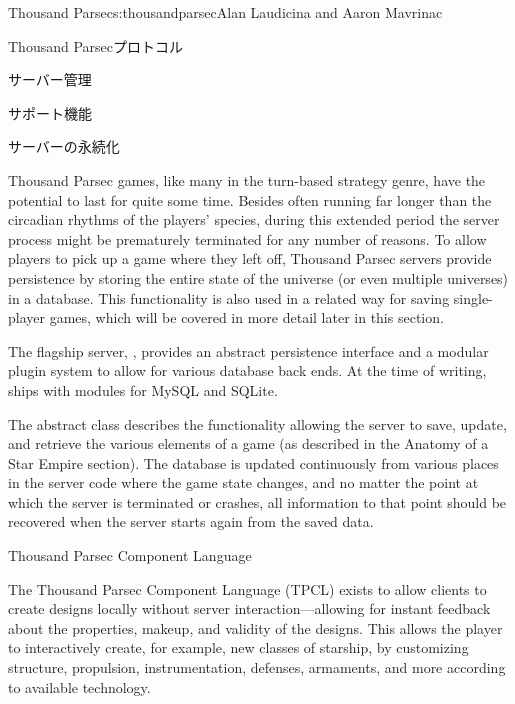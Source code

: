 \begin{aosachapter}{Thousand Parsec}{s:thousandparsec}{Alan Laudicina and Aaron Mavrinac}
\begin{aosasect1}{Thousand Parsecプロトコル}
\begin{aosasect2}{サーバー管理}
\end{aosasect2}

\end{aosasect1}

\begin{aosasect1}{サポート機能}

\begin{aosasect2}{サーバーの永続化}

Thousand Parsec games, like many in the turn-based strategy genre,
have the potential to last for quite some time. Besides often running
far longer than the circadian rhythms of the players' species, during
this extended period the server process might be prematurely
terminated for any number of reasons. To allow players to pick up a
game where they left off, Thousand Parsec servers provide persistence
by storing the entire state of the universe (or even multiple
universes) in a database. This functionality is also used in a related
way for saving single-player games, which will be covered in more
detail later in this section.

The flagship server, , provides an abstract
persistence interface and a modular plugin system to allow for various
database back ends. At the time of writing,  ships
with modules for MySQL and SQLite.

The abstract  class describes the functionality
allowing the server to save, update, and retrieve the various elements
of a game (as described in the Anatomy of a Star Empire section). The
database is updated continuously from various places in the server
code where the game state changes, and no matter the point at which
the server is terminated or crashes, all information to that point
should be recovered when the server starts again from the saved data.

\end{aosasect2}

\begin{aosasect2}{Thousand Parsec Component Language}

The Thousand Parsec Component Language (TPCL) exists to allow clients
to create designs locally without server interaction---allowing for
instant feedback about the properties, makeup, and validity of the
designs. This allows the player to interactively create, for example,
new classes of starship, by customizing structure, propulsion,
instrumentation, defenses, armaments, and more according to available
technology.


\end{aosasect2}
\end{aosasect1}
\end{aosachapter}
